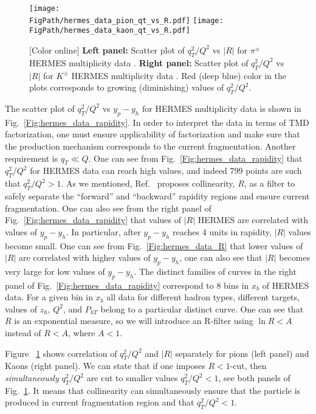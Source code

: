 \documentclass[final,3p,times,onecolumn,sort&compress,hidelinks]{elsarticle}
\newcommand{\xbj}{x_b}
\newcommand*{\FigPath}{../Figs/}%
\begin{document}
\begin{figure}[htb!]
\centering
\texttt{[image: \\FigPath/hermes\_data\_pion\_qt\_vs\_R.pdf]}
\texttt{[image: \\FigPath/hermes\_data\_kaon\_qt\_vs\_R.pdf]}
\caption{\label{Fig:hermes_data_qt_vs_R}
[Color online] {\bf Left panel:} Scatter plot of $q_T^2/Q^2$ vs $|R|$ for $\pi^\pm$ HERMES multiplicity data . {\bf Right panel:} 
Scatter plot of $q_T^2/Q^2$ vs $|R|$ for $K^\pm$ HERMES multiplicity data . Red (deep blue) color in the plots corresponds to growing (diminishing) values of $q_T^2/Q^2$.
}
\end{figure}
The scatter plot of  $q_T^2/Q^2$ vs $y_p-y_h$ for HERMES multiplicity data is shown in Fig.~\ref{Fig:hermes_data_rapidity}. In order to interpret the data in terms of TMD factorization, one must ensure applicability of factorization and make sure that the production mechanism corresponds to the current fragmentation. Another requirement is $q_T \ll Q$. One can see from Fig.~\ref{Fig:hermes_data_rapidity} that  $q_T^2/Q^2$ for HERMES data can reach high values, and indeed 799 points are such that $q_T^2/Q^2>1$. As we mentioned, Ref.~\cite{Boglione:2016bph} proposes collinearity, $R$, as a filter to  safely separate the ``forward'' and ``backward'' rapidity regions and ensure current fragmentation. One can also see from the right panel of Fig.~\ref{Fig:hermes_data_rapidity}  that values of $|R|$ HERMES are correlated with values of $y_p-y_h$. In particular, after $y_p-y_h$ reaches 4 units in rapidity, $|R|$ values become small. One can see from Fig.~\ref{Fig:hermes_data_R} that lower values of $|R|$ are correlated with higher values of $y_p-y_h$, one can also see that $|R|$ becomes very large for low values of $y_p-y_h$. The distinct families of curves in the right panel of Fig.~\ref{Fig:hermes_data_rapidity} correspond to 8 bins in $\xbj$ of HERMES data. For a given bin in $\xbj$ all data for different hadron types, different targets, values of $z_h$, $Q^2$, and $P_{hT}$ belong to a particular distinct curve. One can see that $R$ is an exponential measure, so we will introduce an R-filter using $\ln R < A$ instead of $R < A$, where $A < 1$. 


Figure ~\ref{Fig:hermes_data_qt_vs_R} shows correlation of $q_T^2/Q^2$ and $|R|$ separately for pions (left panel) and Kaons (right panel).
We can state that if one imposes $R<1$-cut, then {\em simultaneously}  $q_T^2/Q^2$ are cut to smaller values $q_T^2/Q^2<1$, see both panels of Fig.~\ref{Fig:hermes_data_qt_vs_R}. It means that collinearity can simultaneously ensure that the particle is produced in current fragmentation region and that $q_T^2/Q^2<1$.
\end{document}
